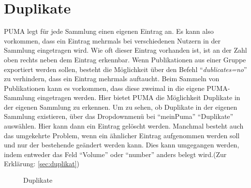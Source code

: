 \section{Duplikate}
PUMA legt für jede Sammlung einen eigenen Eintrag an. Es kann also vorkommen, dass ein Eintrag mehrmals bei verschiedenen Nutzern in der Sammlung eingetragen wird. Wie oft dieser Eintrag vorhanden ist, ist an der Zahl oben rechts neben dem Eintrag erkennbar. Wenn Publikationen aus einer Gruppe exportiert werden sollen, besteht die Möglichkeit über den Befehl \enquote{\textit{dublicates=no}} zu verhindern, dass ein Eintrag mehrmals auftaucht. 
Beim Sammeln von Publikationen kann es vorkommen, dass diese zweimal in die eigene PUMA-Sammlung eingetragen werden. Hier bietet PUMA die Möglichkeit Duplikate in der eigenen Sammlung zu erkennen. Um zu sehen, ob Duplikate in der eigenen Sammlung existieren, über das Dropdownmenü bei \enquote{meinPuma} \enquote{Duplikate} auswählen. Hier kann dann ein Eintrag gelöscht werden.
Manchmal besteht auch das umgekehrte Problem, wenn ein ähnlicher Eintrag aufgenommen werden soll und nur der bestehende geändert werden kann. Dies kann umgegangen werden, indem entweder das Feld \enquote{Volume} oder \enquote{number} anders belegt wird.(Zur Erklärung: \autoref{sec:duplikat})
\begin{figure}[h!]
 \centering
 \caption{Duplikate}
 \label{figure027}
\end{figure}
